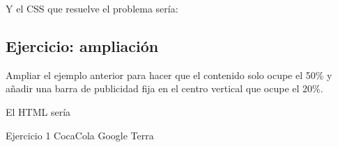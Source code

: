 \documentclass[letterpaper,10pt,spanish]{sphinxmanual}
\begin{document}
Y el CSS que resuelve el problema sería:


\subsection{Ejercicio: ampliación}
\label{\detokenize{tema3:ejercicio-ampliacion}}
Ampliar el ejemplo anterior para hacer que el contenido solo ocupe el 50\% y añadir una barra de publicidad fija en el centro vertical que ocupe el 20\%.

El HTML sería

\begin{sphinxVerbatim}[commandchars=\\\{\}]
           
        Ejercicio 1
 
                         CocaCola
                         Google
                         Terra


\end{sphinxVerbatim}
\end{document}
